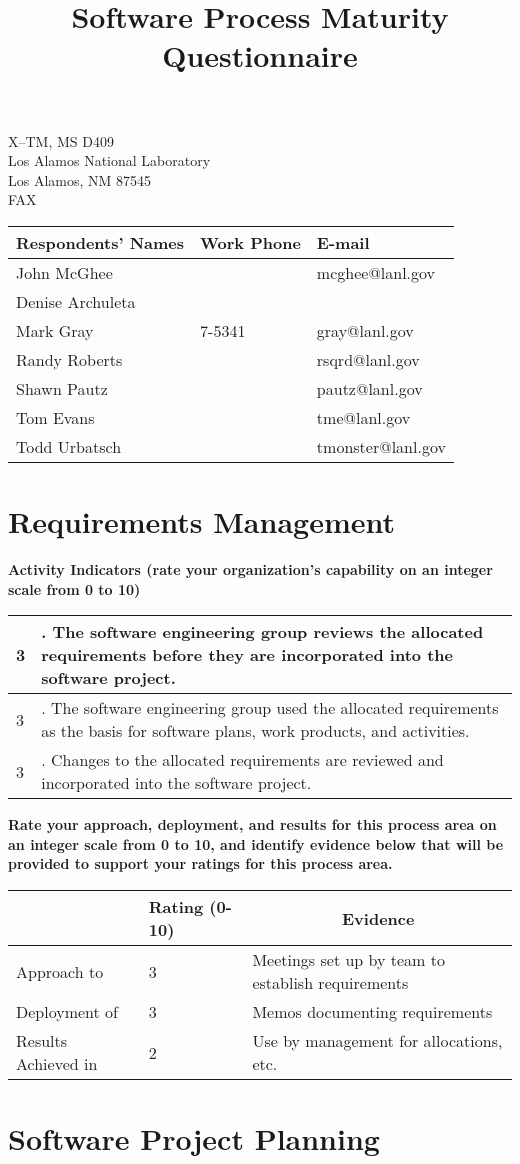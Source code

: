\documentclass{article}
\title{Software Process Maturity Questionnaire}
\newcommand{\KPAname}{}
\newenvironment{KPARate}[1]
	{\renewcommand{\KPAname}{#1}
	 {\bf Rate your approach, deployment, and results for
	  this process area on an integer scale from 0 to 10, and 
	  identify evidence below that will be provided to support your
	  ratings for this process area.}
	 \begin{center}
	 \begin{tabular}{|p{1.0in}|p{0.5in}|p{5.0in}|} \hline
	 & Rating (0-10) & \multicolumn{1}{c|}{Evidence} \\ \hline}
	{\end{tabular}
	 \end{center}}
\newcommand{\Approach}[2]{Approach to \KPAname & #1 & #2 \\ \hline}
\newcommand{\Deployment}[2]{Deployment of \KPAname & #1 & #2 \\ \hline}
\newcommand{\Results}[2]{Results Achieved in \KPAname & #1 & #2 \\
	\hline}
\newcounter{activity}
\newenvironment{KPAActivity}
	{
	 \setcounter{activity}{0}
	 {\bf Activity Indicators (rate your organization's capability
	 on an integer scale from 0 to 10)}
	 \begin{center}
	 \begin{tabular}{|p{0.5in}|p{6.0in}|} \hline
	}
	{
	 \end{tabular}
	 \end{center}
	}
\newcommand{\Activity}[2]{\stepcounter{activity} #1 &
\arabic{activity}. #2 \\ \hline}
\begin{document}
\maketitle
\begin{center}
\parbox{35ex}{X--TM, MS D409\\
Los Alamos National Laboratory\\
Los Alamos, NM 87545\\
FAX \\}

\begin{tabular}{|l|l|l|} \hline
 {\bf Respondents' Names} & {\bf Work Phone} & {\bf E-mail} \\ \hline
John McGhee & & mcghee@lanl.gov \\
Denise Archuleta & & \\
Mark Gray & 7-5341 & gray@lanl.gov \\
Randy Roberts & & rsqrd@lanl.gov \\
Shawn Pautz & &pautz@lanl.gov \\
Tom Evans & & tme@lanl.gov \\
Todd Urbatsch & & tmonster@lanl.gov \\ \hline
\end{tabular}
\end{center}
\newpage
\section{Requirements Management}

\begin{KPAActivity}
\Activity{3}{The software engineering group reviews the allocated
requirements before they are incorporated into the software project.}
\Activity{3}{The software engineering group used the allocated
requirements as the basis for software plans, work products, and
activities.}
\Activity{3}{Changes to the allocated requirements are reviewed and
incorporated into the software project.}
\end{KPAActivity}

\begin{KPARate}{Requirements Management}
\Approach{3}{Meetings set up by team to establish requirements}
\Deployment{3}{Memos documenting requirements}
\Results{2}{Use by management for allocations, etc.}
\end{KPARate}

\newpage
\section{Software Project Planning}
\end{document}
